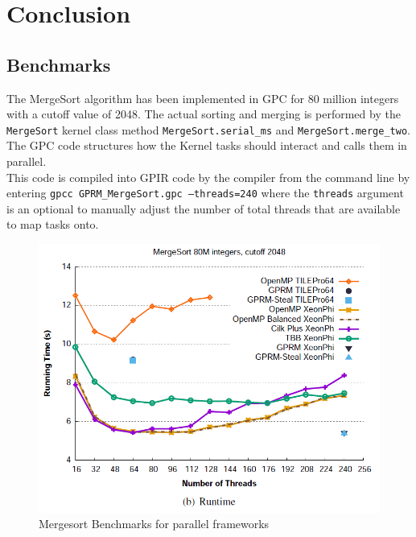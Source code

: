 \chapter{Conclusion}

\section{Benchmarks}

The MergeSort algorithm has been implemented in GPC for 80 million integers with a cutoff value 
of 2048. The actual sorting and merging is performed by the \texttt{MergeSort} kernel class
method \texttt{MergeSort.serial\_ms} and \texttt{MergeSort.merge\_two}. The GPC code structures
how the Kernel tasks should interact and calls them in parallel.\\ 



This code is compiled into GPIR code by the compiler from the command line by entering \texttt{gpcc GPRM\_MergeSort.gpc --threads=240}
where the \texttt{threads} argument is an optional to manually adjust the number of total threads that are available
to map tasks onto.

\newpage

\begin{figure}[!htb]
\includegraphics{graphs/benchmark.png}
\caption{Mergesort Benchmarks for parallel frameworks \cite{GPRMBench}}
\label{fig:bench}
\end{figure}

